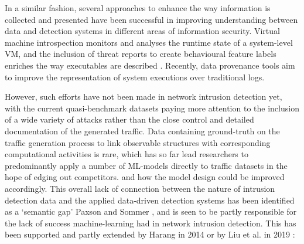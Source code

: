 \documentclass[conference]{IEEEtran}
\begin{document}
In a similar fashion, several approaches to enhance the way information is collected and presented have been successful in improving understanding between data and detection systems in different areas of information security. Virtual machine introspection monitors and analyses the runtime state of a system-level VM, and the inclusion of threat reports to create behavioural feature labels enriches the way executables are described \cite{smith2020mind}. Recently, data provenance tools aim to improve the representation of system executions \cite{barre2019mining} over traditional logs. 

However, such efforts have not been made in network intrusion detection yet, with the current quasi-benchmark datasets paying more attention to the inclusion of a wide variety of attacks rather than the close control and detailed documentation of the generated traffic. Data containing ground-truth on the traffic generation process to link observable structures with corresponding computational activities is rare, which has so far lead researchers to predominantly apply a number of ML-models directly to traffic datasets in the hope of edging out competitors. %
and how the model design could be improved accordingly. This overall lack of connection between the nature of intrusion detection data and the applied data-driven detection systems has been identified as a `semantic gap' Paxson and Sommer \cite{sommer2010outside}, and is seen to be partly responsible for the lack of success machine-learning had in network intrusion detection. This has been supported and partly extended by Harang \cite{harang2014bridging} in 2014 or by Liu et al. in 2019 \cite{liu2019machine}:

\end{document}
